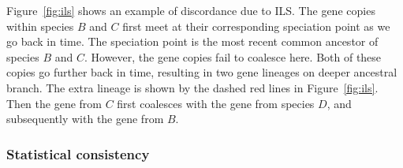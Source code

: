 Figure~\ref{fig:ils} shows an example of discordance due to ILS. The gene copies within species $B$ and $C$ first meet at their corresponding speciation point as we go back in time. The speciation point is the most recent common ancestor of species $B$ and $C$. However, the gene copies fail to coalesce here. Both of these copies go further back in time, resulting in two gene lineages on deeper ancestral branch. The extra lineage is shown by the dashed red lines in Figure~\ref{fig:ils}. Then the gene from $C$ first coalesces with the gene from species $D$, and subsequently with the gene from $B$.

\subsubsection{Statistical consistency}

